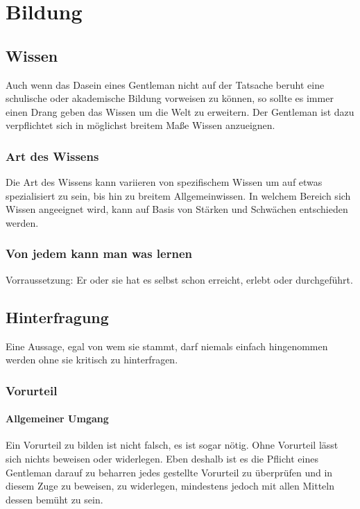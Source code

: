 \chapter{Bildung}

    \section{Wissen}
        Auch wenn das Dasein eines Gentleman nicht auf der Tatsache beruht eine schulische oder akademische Bildung vorweisen zu können, so sollte es immer einen Drang geben das Wissen um die Welt zu erweitern. Der Gentleman ist dazu verpflichtet sich in möglichst breitem Maße Wissen anzueignen.
        
        \subsection{Art des Wissens} 
            Die Art des Wissens kann variieren von spezifischem Wissen um auf etwas spezialisiert zu sein, bis hin zu breitem Allgemeinwissen. In welchem Bereich sich Wissen angeeignet wird, kann auf Basis von Stärken und Schwächen entschieden werden.    
        
        \subsection{Von jedem kann man was lernen}
            Vorraussetzung: Er oder sie hat es selbst schon erreicht, erlebt oder durchgeführt.

    \section{Hinterfragung}\label{sec:hinterfragung}
        Eine Aussage, egal von wem sie stammt, darf niemals einfach hingenommen werden ohne sie kritisch zu hinterfragen.

        \subsection{Vorurteil}
            \subsubsection{Allgemeiner Umgang}
                Ein Vorurteil zu bilden ist nicht falsch, es ist sogar nötig. Ohne Vorurteil lässt sich nichts beweisen oder widerlegen. 
                Eben deshalb ist es die Pflicht eines Gentleman darauf zu beharren jedes gestellte Vorurteil zu überprüfen und in diesem Zuge zu beweisen, 
                zu widerlegen, mindestens jedoch mit allen Mitteln dessen bemüht zu sein.

